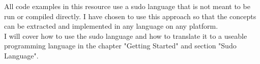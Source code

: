 All code examples in this resource use a sudo language that is not meant to be run or compiled directly.
I have chosen to use this approach so that the concepts can be extracted and implemented in any language
on any platform.
\newline
\\
I will cover how to use the sudo language and how to translate it to a useable programming language
in the chapter "Getting Started" and section "Sudo Language".
